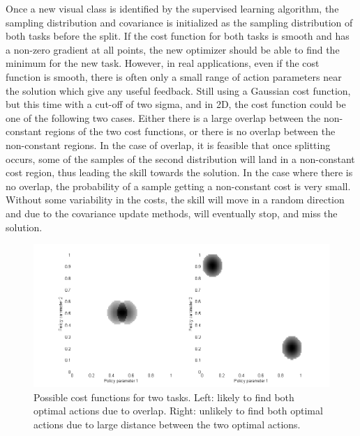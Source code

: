 \documentclass[12pt]{article}
\begin{document}
Once a new visual class is identified by the supervised learning algorithm, the sampling distribution and covariance is initialized as the sampling distribution of both tasks before the split. If the cost function for both tasks is smooth and has a non-zero gradient at all points, the new optimizer should be able to find the minimum for the new task. However, in real applications, even if the cost function is smooth, there is often only a small range of action parameters near the solution which give any useful feedback. Still using a Gaussian cost function, but this time with a cut-off of two sigma, and in 2D, the cost function could be one of the following two cases. Either there is a large overlap between the non-constant regions of the two cost functions, or there is no overlap between the non-constant regions. In the case of overlap, it is feasible that once splitting occurs, some of the samples of the second distribution will land in a non-constant cost region, thus leading the skill towards the solution. In the case where there is no overlap, the probability of a sample getting a non-constant cost is very small. Without some variability in the costs, the skill will move in a random direction and due to the covariance update methods, will eventually stop, and miss the solution.
 
\begin{figure}[ht]
  \centering
  \includegraphics[width=0.9\columnwidth]{cost_function.png}
  \caption{ Possible cost functions for two tasks. Left: likely to find both optimal actions due to overlap. Right: unlikely to find both optimal actions due to large distance between the two optimal actions.}
  \label{fig:costfunction}
\end{figure}
\end{document}
